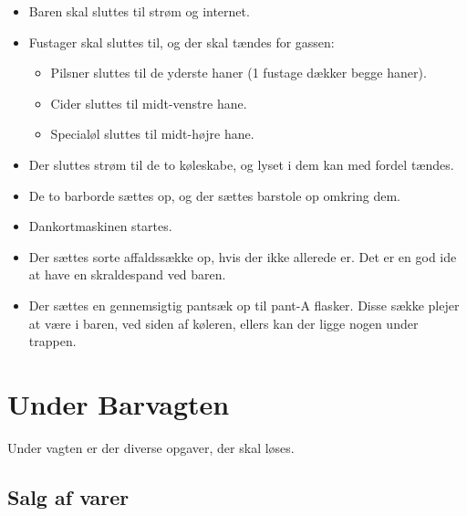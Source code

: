 \begin{itemize}
\item Baren skal sluttes til strøm og internet.
\item Fustager skal sluttes til, og der skal tændes for
  gassen:
  \begin{itemize}
  \item Pilsner sluttes til de yderste haner (1 fustage dækker begge
    haner).
  \item Cider sluttes til midt-venstre hane.
  \item Specialøl sluttes til midt-højre hane.
  \end{itemize}
\item Der sluttes strøm til de to køleskabe, og lyset i dem kan med
  fordel tændes.
\item De to barborde sættes op, og der sættes barstole op omkring dem.
\item Dankortmaskinen startes.
\item Der sættes sorte affaldssække op, hvis der ikke allerede er. Det
  er en god ide at have en skraldespand ved baren.
\item Der sættes en gennemsigtig pantsæk op til pant-A flasker. Disse
  sække plejer at være i baren, ved siden af køleren, ellers kan der
  ligge nogen under trappen.
\end{itemize}

\section{Under Barvagten}
\label{sec:intra-barvagten}

Under vagten er der diverse opgaver, der skal løses.

\subsection{Salg af varer}
\label{sec:intra:salg}

